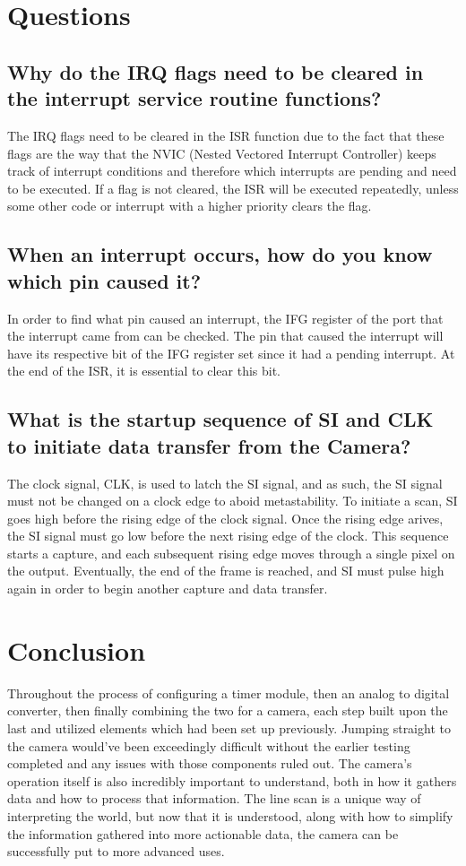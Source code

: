 \documentclass[conference]{IEEEtran}
\begin{document}
\section{Questions}

\subsection{Why do the IRQ flags need to be cleared in the interrupt service
routine functions?}

The IRQ flags need to be cleared in the ISR function due to the fact that
these flags are the way that the NVIC (Nested Vectored Interrupt Controller)
keeps track of interrupt conditions and therefore which interrupts are pending and need to be executed. If
a flag is not cleared, the ISR will be executed repeatedly, unless some other
code or interrupt with a higher priority clears the flag.

\subsection{When an interrupt occurs, how do you know which pin caused it?}

In order to find what pin caused an interrupt, the IFG register of the port
that the interrupt came from can be checked. The pin that caused the
interrupt will have its respective bit of the IFG register set since it had
a pending interrupt. At the end of the ISR, it is essential to clear this
bit.

\subsection{What is the startup sequence of SI and CLK to initiate data 
transfer from the Camera?}

The clock signal, CLK, is used to latch the SI signal, and as such, the SI
signal must not be changed on a clock edge to aboid metastability. To
initiate a scan, SI goes high before the rising edge of the clock signal.
Once the rising edge arives, the SI signal must go low before the next
rising edge of the clock. This sequence starts a capture, and each subsequent
rising edge moves through a single pixel on the output. Eventually, the end
of the frame is reached, and SI must pulse high again in order to begin
another capture and data transfer.

\section{Conclusion}
Throughout the process of configuring a timer module, then an analog to 
digital converter, then finally combining the two for a camera, each step 
built upon the last and utilized elements which had been set up previously. 
Jumping straight to the camera would've been exceedingly difficult without the
 earlier testing completed and any issues with those components ruled out. The
camera's operation itself is also incredibly important to understand, both in 
how it gathers data and how to process that information. The line scan is a 
unique way of interpreting the world, but now that it is understood, along 
with how to simplify the information gathered into more actionable data, the 
camera can be successfully put to more advanced uses.
\end{document}
